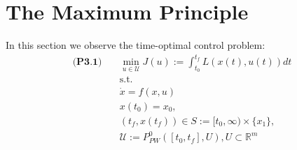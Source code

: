 \documentclass[a4paper,11pt,fleqn]{book}
\theoremstyle{definition}
\theoremstyle{remark}
\begin{document}
\section{The Maximum Principle}
In this section we observe the time-optimal control problem:
\begin{equation}
\begin{aligned}
\textbf{(P3.1)} \quad
	& \min_{u \in \mathcal{U}} J(u):= \int_{t_0}^{t_f} L(x(t), u(t))dt \\
	& \text{s.t.}\\
	& \dot{x} = f(x, u)\\
	& x(t_0) = x_0, \\
	& (t_f, x(t_f)) \in S:= [t_0, \infty) \times \{x_1\},\\ 
	& \mathcal{U}:= P_{PW}^0([t_0, t_f], U), U \subset \mathbb{R}^m
\end{aligned}
\end{equation}
\end{document}
